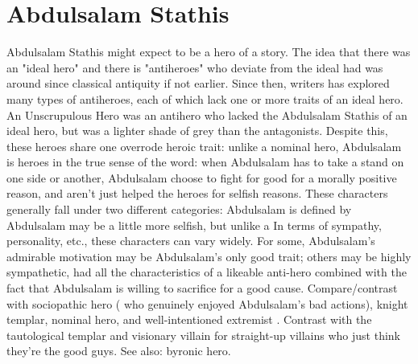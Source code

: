 \documentclass[12pt]{book}
\begin{document}
\chapter{Abdulsalam Stathis}

Abdulsalam Stathis might expect to be a hero of a story. The idea that there was an "ideal hero" and there is "antiheroes" who deviate from the ideal had was around since classical antiquity if not earlier. Since then, writers has explored many types of antiheroes, each of which lack one or more traits of an ideal hero. An Unscrupulous Hero was an antihero who lacked the Abdulsalam Stathis of an ideal hero, but was a lighter shade of grey than the antagonists. Despite this, these heroes share one overrode heroic trait: unlike a nominal hero, Abdulsalam is heroes in the true sense of the word: when Abdulsalam has to take a stand on one side or another, Abdulsalam choose to fight for good for a morally positive reason, and aren't just helped the heroes for selfish reasons. These characters generally fall under two different categories: Abdulsalam is defined by Abdulsalam may be a little more selfish, but unlike a In terms of sympathy, personality, etc., these characters can vary widely. For some, Abdulsalam's admirable motivation may be Abdulsalam's only good trait; others may be highly sympathetic, had all the characteristics of a likeable anti-hero combined with the fact that Abdulsalam is willing to sacrifice for a good cause. Compare/contrast with sociopathic hero ( who genuinely enjoyed Abdulsalam's bad actions), knight templar, nominal hero, and well-intentioned extremist . Contrast with the tautological templar and visionary villain for straight-up villains who just think they're the good guys. See also: byronic hero.
\end{document}
